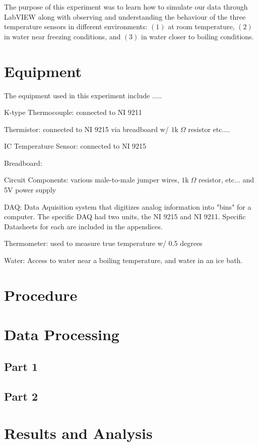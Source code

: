 \documentclass{article}
\begin{document}
The purpose of this experiment was to learn how to simulate our data through LabVIEW along with observing and understanding the behaviour of the three temperature sensors in different environments: $(1)$ at room temperature, $(2)$ in water near freezing conditions, and $(3)$ in water closer to boiling conditions. 

\section{Equipment}
The equipment used in this experiment include .....

K-type Thermocouple:  connected to NI 9211

Thermistor:  connected to NI 9215 via breadboard w/ $1\text{k}\;\Omega$ resistor etc....

IC Temperature Sensor: connected to NI 9215

Breadboard: 

Circuit Components:  various male-to-male jumper wires, $1\text{k}\;\Omega$ resistor, etc... and 5V power supply

DAQ:  Data Aquisition system that digitizes analog information into "bins" for a computer.  The specific DAQ had two units, the NI 9215 and NI 9211.  Specific Datasheets for each are included in the appendices.  

Thermometer:  used to measure true temperature w/ 0.5 degrees 

Water:  Access to water near a boiling temperature, and water in an ice bath.   




\section{Procedure}


\section{Data Processing}

\subsection{Part 1}


\subsection{Part 2}


\section{Results and Analysis}
\end{document}

